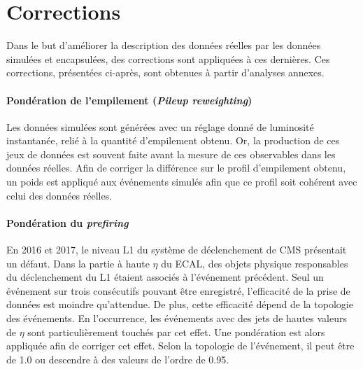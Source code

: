 \section{Corrections}\label{chapter-HTT_analysis-section-corrections}
Dans le but d'améliorer la description des données réelles par les données simulées et encapsulées, des corrections sont appliquées à ces dernières.
Ces corrections, présentées ci-après, sont obtenues à partir d'analyses annexes.
\paragraph{Pondération de l'empilement (\emph{Pileup reweighting})}
Les données simulées sont générées avec un réglage donné de luminosité instantanée, relié à la quantité d'empilement obtenu.
Or, la production de ces jeux de données est souvent faite avant la mesure de ces observables dans les données réelles.
Afin de corriger la différence sur le profil d'empilement obtenu, un poids est appliqué aux événements simulés afin que ce profil soit cohérent avec celui des données réelles.
\paragraph{Pondération du \emph{prefiring}}
En 2016 et 2017, le niveau L1 du système de déclenchement de CMS présentait un défaut.
Dans la partie à haute $\eta$ du ECAL, des objets physique responsables du déclenchement du L1 étaient associés à l'événement précédent.
Seul un événement sur trois consécutifs pouvant être enregistré, l'efficacité de la prise de données est moindre qu'attendue.
De plus, cette efficacité dépend de la topologie des événements.
En l'occurrence, les événements avec des jets de hautes valeurs de $\eta$ sont particulièrement touchés par cet effet.
Une pondération est alors appliquée afin de corriger cet effet.
Selon la topologie de l'événement, il peut être de \num{1.0} ou descendre à des valeurs de l'ordre de \num{0.95}.
